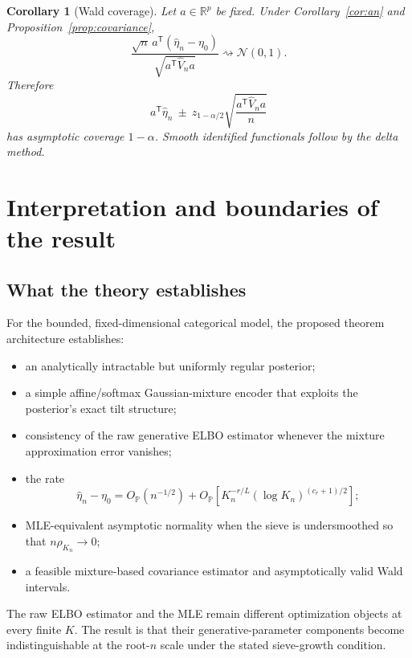 \documentclass[11pt]{article}
\newtheorem{corollary}[theorem]{Corollary}
\theoremstyle{definition}
\newcommand{\R}{\mathbb R}
\newcommand{\Pp}{\mathbb P}
\newcommand{\Op}{O_{\Pp}}
\newcommand{\trans}{\mathsf T}
\newcommand{\cN}{\mathcal N}
\begin{document}
\begin{corollary}[Wald coverage]
\label{cor:coverage}
Let $a\in\R^p$ be fixed. Under Corollary~\ref{cor:an} and Proposition~\ref{prop:covariance},
\begin{equation}
\frac{\sqrt n\,a^{\trans}(\widehat\eta_n-\eta_0)}
{\sqrt{a^{\trans}\widehat V_na}}
\rightsquigarrow\cN(0,1).
\end{equation}
Therefore
\begin{equation}
a^{\trans}\widehat\eta_n
\ \pm\ 
z_{1-\alpha/2}
\sqrt{\frac{a^{\trans}\widehat V_na}{n}}
\label{eq:wald-ci}
\end{equation}
has asymptotic coverage $1-\alpha$. Smooth identified functionals follow by the delta method.
\end{corollary}

\section{Interpretation and boundaries of the result}

\subsection{What the theory establishes}

For the bounded, fixed-dimensional categorical model, the proposed theorem architecture establishes:
\begin{itemize}
\item an analytically intractable but uniformly regular posterior;
\item a simple affine/softmax Gaussian-mixture encoder that exploits the posterior's exact tilt structure;
\item consistency of the raw generative ELBO estimator whenever the mixture approximation error vanishes;
\item the rate
\[
\widehat\eta_n-\eta_0
=
\Op(n^{-1/2})+
\Op\!\left[K_n^{-r/L}(\log K_n)^{(c_r+1)/2}\right];
\]
\item MLE-equivalent asymptotic normality when the sieve is undersmoothed so that $n\rho_{K_n}\to0$;
\item a feasible mixture-based covariance estimator and asymptotically valid Wald intervals.
\end{itemize}

The raw ELBO estimator and the MLE remain different optimization objects at every finite $K$. The result is that their generative-parameter components become indistinguishable at the root-$n$ scale under the stated sieve-growth condition.
\end{document}
